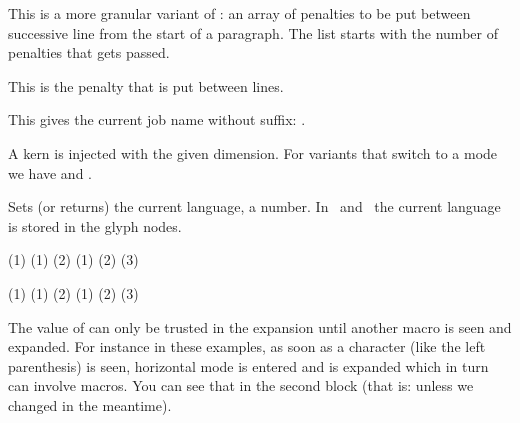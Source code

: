 \stopoldprimitive

\startoldprimitive[title={\prm {interlinepenalties}}]

This is a more granular variant of : an array of penalties
to be put between successive line from the start of a paragraph. The list starts
with the number of penalties that gets passed.

\stopoldprimitive

\startoldprimitive[title={\prm {interlinepenalty}}]

This is the penalty that is put between lines.

\stopoldprimitive

\startoldprimitive[title={\prm {jobname}}]

This gives the current job name without suffix: {\tttf \jobname}.

\stopoldprimitive

\startoldprimitive[title={\prm {kern}}]

A kern is injected with the given dimension. For variants that switch to a mode
we have  and .

\stopoldprimitive

\startoldprimitive[title={\prm {language}}]

Sets (or returns) the current language, a number. In \LUATEX\ and \LUAMETATEX\
the current language is stored in the glyph nodes.

\stopoldprimitive

\startnewprimitive[title={\prm {lastarguments}}]

\startbuffer
\def\MyMacro    #1{\the\lastarguments (#1) }          \MyMacro{1}       \crlf
\def\MyMacro  #1#2{\the\lastarguments (#1) (#2)}      \MyMacro{1}{2}    \crlf
\def\MyMacro#1#2#3{\the\lastarguments (#1) (#2) (#3)} \MyMacro{1}{2}{3} \par

\def\MyMacro    #1{(#1)           \the\lastarguments} \MyMacro{1}       \crlf
\def\MyMacro  #1#2{(#1) (#2)      \the\lastarguments} \MyMacro{1}{2}    \crlf
\def\MyMacro#1#2#3{(#1) (#2) (#3) \the\lastarguments} \MyMacro{1}{2}{3} \par
\stopbuffer

\typebuffer

The value of  can only be trusted in the expansion until
another macro is seen and expanded. For instance in these examples, as soon as a
character (like the left parenthesis) is seen, horizontal mode is entered and
 is expanded which in turn can involve macros. You can see that
in the second block (that is: unless we changed \prm {everypar} in the
meantime).

